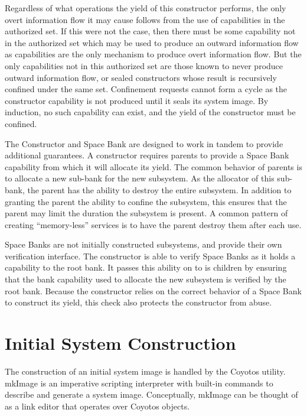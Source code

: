 Regardless of what operations the yield of this constructor performs, the only overt information flow it may cause follows from the use of capabilities in the authorized set.
If this were not the case, then there must be some capability not in the authorized set which may be used to produce an outward information flow as capabilities are the only mechanism to produce overt information flow.
But the only capabilities not in this authorized set are those known to never produce outward information flow, or sealed constructors whose result is recursively confined under the same set.
Confinement requests cannot form a cycle as the constructor capability is not produced until it seals its system image.
By induction, no such capability can exist, and the yield of the constructor must be confined.

The Constructor and Space Bank are designed to work in tandem to provide additional guarantees.
A constructor requires parents to provide a Space Bank capability from which it will allocate its yield.
The common behavior of parents is to allocate a new sub-bank for the new subsystem.
As the allocator of this sub-bank, the parent has the ability to destroy the entire subsystem.
In addition to granting the parent the ability to confine the subsystem, this ensures that the parent may limit the duration the subsystem is present.
A common pattern of creating ``memory-less'' services is to have the parent destroy them after each use.

Space Banks are not initially constructed subsystems, and provide their own verification interface.
The constructor is able to verify Space Banks as it holds a capability to the root bank.
It passes this ability on to is children by ensuring that the bank capability used to allocate the new subsystem is verified by the root bank.
Because the constructor relies on the correct behavior of a Space Bank to construct its yield, this check also protects the constructor from abuse.

\section{Initial System Construction}

The construction of an initial system image is handled by the Coyotos  utility.
mkImage is an imperative scripting interpreter with built-in commands to describe and generate a system image.
Conceptually, mkImage can be thought of as a link editor that operates over Coyotos objects. 

